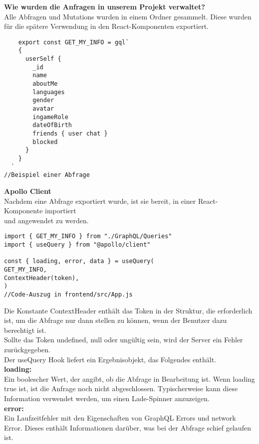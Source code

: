 \textbf{Wie wurden die Anfragen in unserem Projekt verwaltet?}\\
Alle Abfragen und Mutations wurden in einem Ordner gesammelt.
Diese wurden für die spätere Verwendung in den React-Komponenten exportiert.

\begin{lstlisting}
    export const GET_MY_INFO = gql`
    {
      userSelf {
        _id
        name
        aboutMe
        languages
        gender
        avatar
        ingameRole
        dateOfBirth
        friends { user chat }        
        blocked
      }
    }
  `
//Beispiel einer Abfrage
\end{lstlisting}


\newpage
\textbf{Apollo Client}\\
Nachdem eine Abfrage exportiert wurde, ist sie bereit, in einer React-Komponente importiert \\ und angewendet zu werden.

\begin{lstlisting}
import { GET_MY_INFO } from "./GraphQL/Queries"
import { useQuery } from "@apollo/client"

const { loading, error, data } = useQuery(
GET_MY_INFO,
ContextHeader(token),
)
//Code-Auszug in frontend/src/App.js

\end{lstlisting}
Die Konstante ContextHeader enthält das Token in der Struktur, die erforderlich ist, um die Abfrage nur dann stellen zu können, wenn der Benutzer dazu berechtigt ist.
\\
Sollte das Token undefined, null oder ungültig sein, wird der Server ein Fehler zurückgegeben.
\\ 

Der useQuery Hook liefert ein Ergebnisobjekt, das Folgendes enthält.
\\
\textbf{loading:}\\
Ein boolescher Wert, der angibt, ob die Abfrage in Bearbeitung ist.
Wenn loading true ist, ist die Anfrage noch nicht abgeschlossen. Typischerweise kann diese Information verwendet werden, um einen Lade-Spinner anzuzeigen.
\\

\textbf{error:}\\
Ein Laufzeitfehler mit den Eigenschaften von GraphQL Errors und network Error.
Dieses enthält Informationen darüber, was bei der Abfrage schief gelaufen ist.
\\

